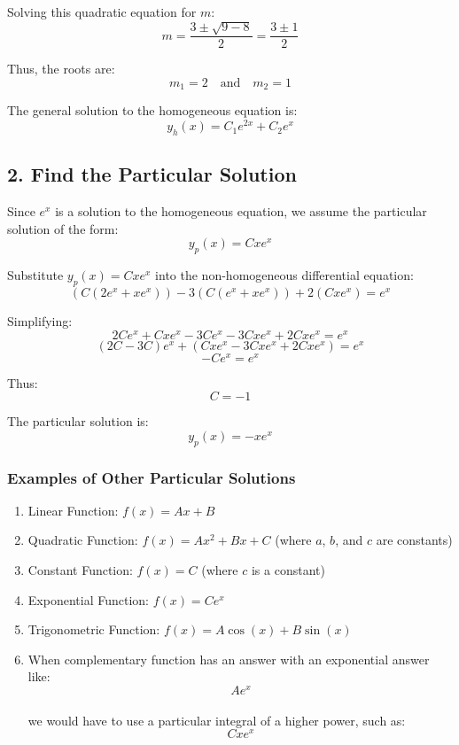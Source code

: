 \documentclass[a4paper,12pt]{article}
\begin{document}
Solving this quadratic equation for \(m\):
\[
m = \frac{3 \pm \sqrt{9 - 8}}{2} = \frac{3 \pm 1}{2}
\]

Thus, the roots are:
\[
m_1 = 2 \quad \text{and} \quad m_2 = 1
\]

The general solution to the homogeneous equation is:
\[
y_h(x) = C_1 e^{2x} + C_2 e^{x}
\]

\subsection*{2. Find the Particular Solution}

Since \(e^x\) is a solution to the homogeneous equation, we assume the particular solution of the form:
\[
y_p(x) = C x e^x
\]

Substitute \(y_p(x) = C x e^x\) into the non-homogeneous differential equation:
\[
(C (2 e^x + x e^x)) - 3 (C (e^x + x e^x)) + 2 (C x e^x) = e^x
\]

Simplifying:
\[
2C e^x + C x e^x - 3C e^x - 3C x e^x + 2C x e^x = e^x
\]
\[
(2C - 3C)e^x + (C x e^x - 3C x e^x + 2C x e^x) = e^x
\]
\[
-C e^x = e^x
\]

Thus:
\[
C = -1
\]

The particular solution is:
\[
y_p(x) = -x e^x
\]

\subsubsection{Examples of Other Particular Solutions}
\begin{enumerate}
    \item Linear Function: $f(x) = Ax + B$ 
    
    \item Quadratic Function: $f(x) = Ax^2 + Bx + C$ \quad (where $a$, $b$, and $c$ are constants)
    
    \item Constant Function: $f(x) = C$ \quad (where $c$ is a constant)
    
    \item Exponential Function: $f(x) = Ce^x$
    
    \item Trigonometric Function: $f(x) = A\cos(x) + B\sin(x)$

    \item When complementary function has an answer with an exponential answer like: \[Ae^x\]\\
    we would have to use a particular integral of a higher power, such as: \[Cxe^x\]

\end{enumerate}
\end{document}
